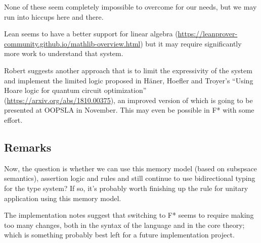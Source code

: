 \documentclass[acmsmall,nonacm,timestamp,review=false,anonymous=false]{acmart}
\begin{document}
None of these seem completely impossible to overcome for our needs, but we may run into hiccups here and there.

Lean seems to have a better support for linear algebra (\url{https://leanprover-community.github.io/mathlib-overview.html}) but it may require significantly more work to understand that system.

Robert suggests another approach that is to limit the expressivity of the system and implement the limited logic proposed in Häner, Hoefler and Troyer's ``Using Hoare logic for quantum circuit optimization'' (\url{https://arxiv.org/abs/1810.00375}), an improved version of which is going to be presented at OOPSLA in November. This may even be possible in F* with some effort.

\subsection{Remarks}
Now, the question is whether we can use this memory model (based on subspsace semantics), assertion logic and rules and still continue to use bidirectional typing for the type system? If so, it's probably worth finishing up the rule for unitary application using this memory model.

The implementation notes suggest that switching to F* seems to require making too many changes, both in the syntax of the language and in the core theory; which is something probably best left for a future implementation project.

\end{document}
